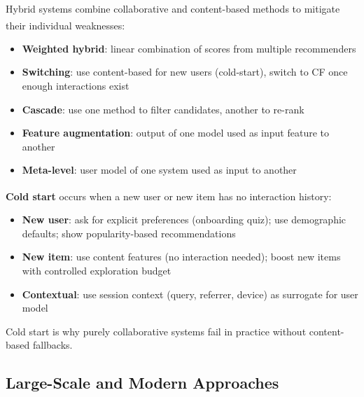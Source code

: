 \begin{tcbitemize}[ skin=sectionraster ]

    \tcbitem[title=Hybrid Approaches, raster multicolumn=3]
    Hybrid systems combine collaborative and content-based methods to mitigate their individual weaknesses\textsuperscript{\cite[][pp.~80--87]{jannachRecommenderSystemsIntroduction2010}}:
    \begin{itemize}
        \item \textbf{Weighted hybrid}: linear combination of scores from multiple recommenders
        \item \textbf{Switching}: use content-based for new users (cold-start), switch to CF once enough interactions exist
        \item \textbf{Cascade}: use one method to filter candidates, another to re-rank
        \item \textbf{Feature augmentation}: output of one model used as input feature to another
        \item \textbf{Meta-level}: user model of one system used as input to another
    \end{itemize}

    \tcbitem[title=The Cold-Start Problem, raster multicolumn=3]
    \textbf{Cold start} occurs when a new user or new item has no interaction history\textsuperscript{\cite[][pp.~88--92]{aggarwalRecommenderSystems2016}}:
    \begin{itemize}
        \item \textbf{New user}: ask for explicit preferences (onboarding quiz); use demographic defaults; show popularity-based recommendations
        \item \textbf{New item}: use content features (no interaction needed); boost new items with controlled exploration budget
        \item \textbf{Contextual}: use session context (query, referrer, device) as surrogate for user model
    \end{itemize}
    Cold start is why purely collaborative systems fail in practice without content-based fallbacks.

\end{tcbitemize}

\subsection{Large-Scale and Modern Approaches}

